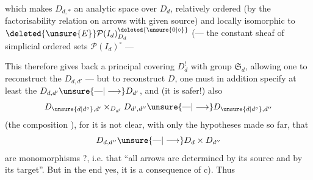 which makes $D_{d,*}$ an analytic space over $D_d$,  relatively ordered (by the factorisability relation
\diagram{\begin{tikzcd}[ampersand replacement=\&, column sep=small,row sep=small]
{} \& {} \arrow[dd,dotted] \\
\bullet \arrow[ru] \arrow[rd] \& \\
{} \& {}
\end{tikzcd}}
on arrows with given source)  and locally isomorphic to $\deleted{\unsure{E}}\mathcal P(I_d)^{\deleted{\unsure{0|\circ}}}_{D_d}$  (--- the constant sheaf of simplicial ordered sets $\mathcal P(I_d)^\circ$ ---

This therefore gives back a principal covering $D^!_d$ with group $\mathfrak S_d$, allowing one to reconstruct the $D_{d,d'}$ --- but to reconstruct $D$, one must in addition specify  at least the $D_{d,d'}\unsure{\text{---}|\longrightarrow}D_{d'}$, and (it is safer!) also
\[
D_{\unsure{d|d^\circ},d'}\mathbin{\times}_{D_{d'}}D_{d',d''}\unsure{\text{---}|\longrightarrow}D_{\unsure{d|d^\circ},d''}
\]
(the composition ), for it is not clear, with only the hypotheses made so far, that  
\[
D_{d,d''}\unsure{\text{---}|\longrightarrow}D_d\times D_{d''}
\]
are monomorphisms ?, i.e. that ``all arrows are determined by its source and by its target''. But in the end yes, it is a consequence of c). Thus
